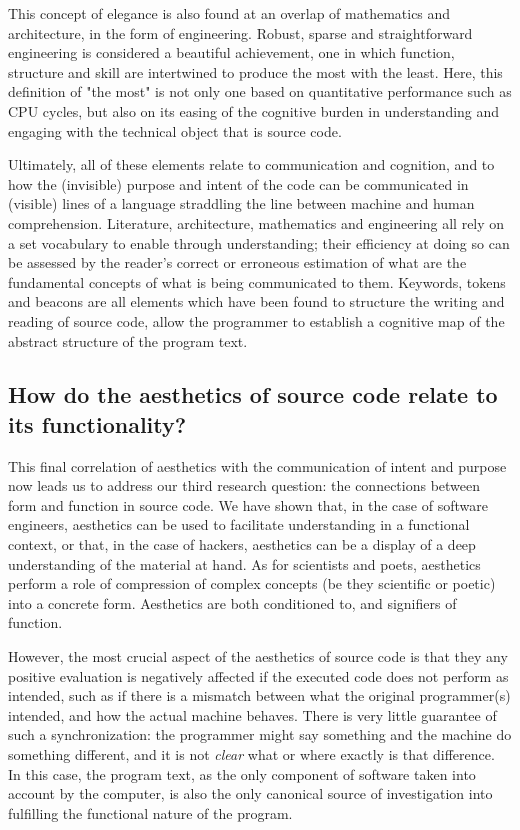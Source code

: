 This concept of elegance is also found at an overlap of mathematics and architecture, in the form of engineering. Robust, sparse and straightforward engineering is considered a beautiful achievement, one in which function, structure and skill are intertwined to produce the most with the least. Here, this definition of "the most" is not only one based on quantitative performance such as CPU cycles, but also on its easing of the cognitive burden in understanding and engaging with the technical object that is source code.

Ultimately, all of these elements relate to communication and cognition, and to how the (invisible) purpose and intent of the code can be communicated in (visible) lines of a language straddling the line between machine and human comprehension. Literature, architecture, mathematics and engineering all rely on a set vocabulary to enable through understanding; their efficiency at doing so can be assessed by the reader's correct or erroneous estimation of what are the fundamental concepts of what is being communicated to them. Keywords, tokens and beacons are all elements which have been found to structure the writing and reading of source code, allow the programmer to establish a cognitive map of the abstract structure of the program text.

\subsection{How do the aesthetics of source code relate to its functionality?}
\label{subsec:conclusion-rq-3}

This final correlation of aesthetics with the communication of intent and purpose now leads us to address our third research question: the connections between form and function in source code. We have shown that, in the case of software engineers, aesthetics can be used to facilitate understanding in a functional context, or that, in the case of hackers, aesthetics can be a display of a deep understanding of the material at hand. As for scientists and poets, aesthetics perform a role of compression of complex concepts (be they scientific or poetic) into a concrete form. Aesthetics are both conditioned to, and signifiers of function.

However, the most crucial aspect of the aesthetics of source code is that they any positive evaluation is negatively affected if the executed code does not perform as intended, such as if there is a mismatch between what the original programmer(s) intended, and how the actual machine behaves. There is very little guarantee of such a synchronization: the programmer might say something and the machine do something different, and it is not \emph{clear} what or where exactly is that difference. In this case, the program text, as the only component of software taken into account by the computer, is also the only canonical source of investigation into fulfilling the functional nature of the program.

